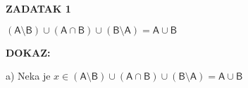 \documentclass[a4paper]{article}
\begin{document}
    \thispagestyle{empty}

    \begin{flushleft}

        \textbf{ZADATAK 1}\\
        \bigskip

        $(\mathsf{A}\setminus \mathsf{B})\cup (\mathsf{A}\cap \mathsf{B})\cup (\mathsf{B}\setminus \mathsf{A})=\mathsf{A}\cup \mathsf{B}$\\
        \bigskip

        \textbf{DOKAZ:}
        \bigskip

        a) Neka je $x\in (\mathsf{A}\setminus \mathsf{B})\cup (\mathsf{A}\cap \mathsf{B})\cup (\mathsf{B}\setminus \mathsf{A})=\mathsf{A}\cup \mathsf{B}$


    \end{flushleft}
    
\end{document}
